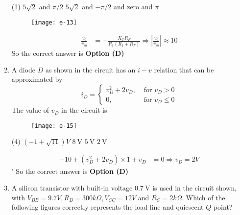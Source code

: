 \begin{enumerate}
\begin{minipage}{0.45\textwidth}
\begin{tasks}(1)
	\task[\textbf{A.}] $5 \sqrt{2}$ and $\pi / 2$
	\task[\textbf{B.}] $5 \sqrt{2}$ and $-\pi / 2$
	 and zero
	 and $\pi$
\end{tasks}
\end{minipage}
\begin{minipage}{0.45\textwidth}
\begin{figure}[H]
	\centering
	\texttt{[image: e-13]}
\end{figure}
\end{minipage}
\begin{answer}
\begin{align*}
\frac{v_{0}}{v_{i n}}
&=-\frac{X_{C} R_{F}}{R_{1}\left(R_{1}+R_{F}\right)} \Rightarrow\left|\frac{v_{0}}{v_{i n}}\right| \approx 10
\end{align*}
So the correct answer is \textbf{Option (D)}
\end{answer}
	\item A diode $D$ as shown in the circuit has an $i-v$ relation that can be approximated by
	$$i_{D}=\left\{\begin{array}{ll}v_{D}^{2}+2 v_{D}, & \text { for } v_{D}>0 \\ 0, & \text { for } v_{D} \leq 0\end{array}\right.$$
	The value of $v_{D}$ in the circuit is
\begin{figure}[H]
\centering
\texttt{[image: e-15]}
\end{figure}
\begin{tasks}(4)
\task[\textbf{A.}] $(-1+\sqrt{11}) V$
\task[\textbf{B.}] $8 \mathrm{~V}$
\task[\textbf{C.}] $5 \mathrm{~V}$
\task[\textbf{D.}] $2 \mathrm{~V}$
\end{tasks}
\begin{answer}
\begin{align*}
-10+\left(v_{D}^{2}+2 v_{D}\right) \times 1+v_{D}&=0 \Rightarrow v_{D}=2 V
\end{align*}'
So the correct answer is \textbf{Option (D)}
\end{answer}
	\item A silicon transistor with built-in voltage $0.7 \mathrm{~V}$ is used in the circuit shown, with $V_{B B}=9.7 V, R_{B}=300 k \Omega, V_{C C}=12 V$ and $R_{C}=2 k \Omega$. Which of the following figures correctly represents the load line and quiescent $Q$ point?
\begin{figure}[H]

\end{figure}
\end{enumerate}
